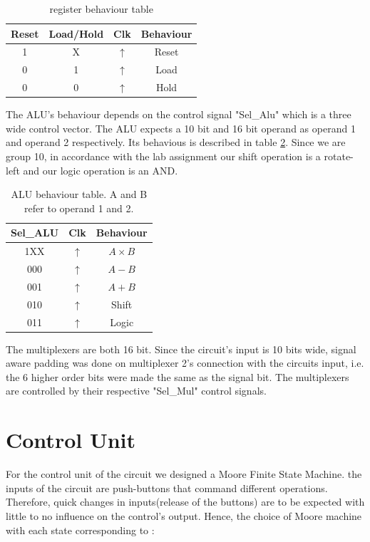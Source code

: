 \documentclass[12pt]{article}
\begin{document}
\begin{table}[H]
	\center
	\begin{tabular}{|c|c|c|c|}
		\hline
		Reset & Load/Hold & Clk        & Behaviour \\
		\hline
		1     & X         & $\uparrow$ & Reset     \\
		0     & 1         & $\uparrow$ & Load      \\
		0     & 0         & $\uparrow$ & Hold      \\
		\hline
	\end{tabular}
	\caption{register behaviour table}
	\label{tab:Reg}
\end{table}

The ALU's behaviour depends on the control signal "Sel\_Alu" which is a three wide control vector. The ALU expects a 10 bit and 16 bit operand as operand 1 and operand 2 respectively. Its behavious is described in table \ref{tab:ALU}. Since we are group 10, in accordance with the lab assignment our shift operation is a rotate-left and our logic operation is an AND.

\begin{table}[H]
	\center
	\begin{tabular}{|c|c|c|}
		\hline
		Sel\_ALU & Clk        & Behaviour       \\
		\hline
		1XX     & $\uparrow$ & $A \times B$ \\
		000     & $\uparrow$ & $A-B$        \\
		001     & $\uparrow$ & $A+B$        \\
		010     & $\uparrow$ & Shift        \\
		011     & $\uparrow$ & Logic        \\
		\hline
	\end{tabular}
	\caption{ALU behaviour table. A and B refer to operand 1 and 2.}
	\label{tab:ALU}
\end{table}

The multiplexers are both 16 bit. Since the circuit's input is 10 bits wide, signal aware padding was done on multiplexer 2's connection with the circuits input, i.e. the 6 higher order bits were made the same as the signal bit.
The multiplexers are controlled by their respective "Sel\_Mul" control signals.

\newpage
\section{Control Unit}
For the control unit of the circuit we designed a Moore Finite State Machine.
the inputs of the circuit are push-buttons that command different operations. Therefore, quick changes in inputs(release of the buttons) are to be expected with little to no influence on the control's output. Hence, the choice of Moore machine with each state corresponding to :
\end{document}
